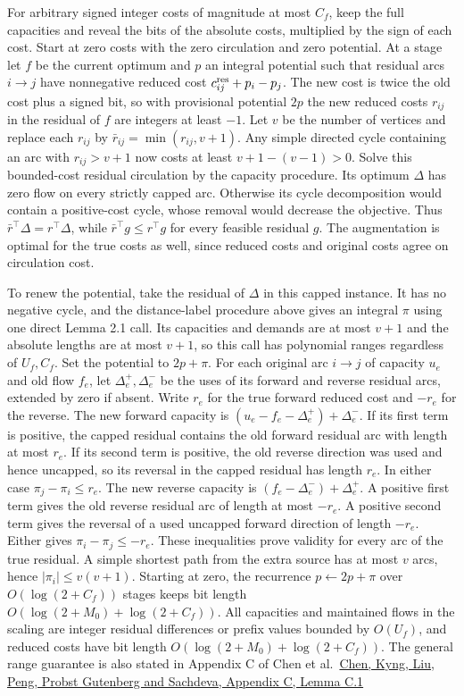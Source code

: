 \documentclass[11pt]{article}
\begin{document}
For arbitrary signed integer costs of magnitude at most \(C_f\), keep the full capacities and reveal the bits of the absolute costs, multiplied by the sign of each cost. Start at zero costs with the zero circulation and zero potential. At a stage let \(f\) be the current optimum and \(p\) an integral potential such that residual arcs \(i\to j\) have nonnegative reduced cost \(c^{\rm res}_{ij}+p_i-p_j\). The new cost is twice the old cost plus a signed bit, so with provisional potential \(2p\) the new reduced costs \(r_{ij}\) in the residual of \(f\) are integers at least \(-1\). Let \(v\) be the number of vertices and replace each \(r_{ij}\) by \(\bar r_{ij}=\min(r_{ij},v+1)\). Any simple directed cycle containing an arc with \(r_{ij}>v+1\) now costs at least \(v+1-(v-1)>0\). Solve this bounded-cost residual circulation by the capacity procedure. Its optimum \(\Delta\) has zero flow on every strictly capped arc. Otherwise its cycle decomposition would contain a positive-cost cycle, whose removal would decrease the objective. Thus \(\bar r^\top\Delta=r^\top\Delta\), while \(\bar r^\top g\le r^\top g\) for every feasible residual \(g\). The augmentation is optimal for the true costs as well, since reduced costs and original costs agree on circulation cost.

To renew the potential, take the residual of \(\Delta\) in this capped instance. It has no negative cycle, and the distance-label procedure above gives an integral \(\pi\) using one direct Lemma 2.1 call. Its capacities and demands are at most \(v+1\) and the absolute lengths are at most \(v+1\), so this call has polynomial ranges regardless of \(U_f,C_f\). Set the potential to \(2p+\pi\). For each original arc \(i\to j\) of capacity \(u_e\) and old flow \(f_e\), let \(\Delta_e^+,\Delta_e^-\) be the uses of its forward and reverse residual arcs, extended by zero if absent. Write \(r_e\) for the true forward reduced cost and \(-r_e\) for the reverse. The new forward capacity is \((u_e-f_e-\Delta_e^+)+\Delta_e^-\). If its first term is positive, the capped residual contains the old forward residual arc with length at most \(r_e\). If its second term is positive, the old reverse direction was used and hence uncapped, so its reversal in the capped residual has length \(r_e\). In either case \(\pi_j-\pi_i\le r_e\). The new reverse capacity is \((f_e-\Delta_e^-)+\Delta_e^+\). A positive first term gives the old reverse residual arc of length at most \(-r_e\). A positive second term gives the reversal of a used uncapped forward direction of length \(-r_e\). Either gives \(\pi_i-\pi_j\le-r_e\). These inequalities prove validity for every arc of the true residual. A simple shortest path from the extra source has at most \(v\) arcs, hence \(|\pi_i|\le v(v+1)\). Starting at zero, the recurrence \(p\leftarrow2p+\pi\) over \(O(\log(2+C_f))\) stages keeps bit length \(O(\log(2+M_0)+\log(2+C_f))\). All capacities and maintained flows in the scaling are integer residual differences or prefix values bounded by \(O(U_f)\), and reduced costs have bit length \(O(\log(2+M_0)+\log(2+C_f))\). The general range guarantee is also stated in Appendix C of Chen et al.~\href{https://arxiv.org/pdf/2203.00671v2}{Chen, Kyng, Liu, Peng, Probst Gutenberg and Sachdeva, Appendix C, Lemma C.1}
\end{document}
